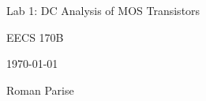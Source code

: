 \centering
\vspace{2.5cm}
{\huge Lab 1: DC Analysis of MOS Transistors \par}
{\Large EECS 170B \par}
{\Large \today \par}
\vspace{1cm}
{\large Roman Parise \par}
\vspace{1cm}
